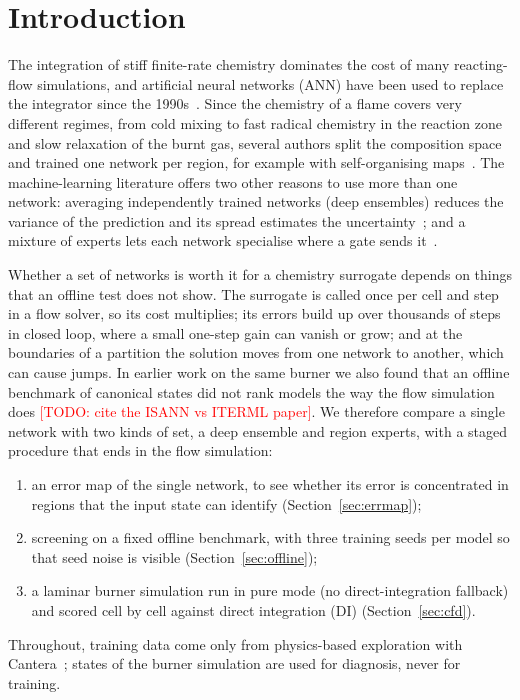 \documentclass[preprint,review,12pt]{elsarticle}
\newcommand{\todo}[1]{\textcolor{red}{[TODO: #1]}}
\begin{document}
\section{Introduction}
\label{sec:intro}

The integration of stiff finite-rate chemistry dominates the cost of many reacting-flow simulations, and
artificial neural networks (ANN) have been used to replace the integrator since the
1990s~\cite{christo1996ann,blasco1998ann}. Since the chemistry of a flame covers very different regimes,
from cold mixing to fast radical chemistry in the reaction zone and slow relaxation of the burnt gas,
several authors split the composition space and trained one network per region, for example with
self-organising maps~\cite{chatzopoulos2013rcce,franke2017rcce,ding2021hybrid,readshaw2021hybrid}. The
machine-learning literature offers two other reasons to use more than one network: averaging
independently trained networks (deep ensembles) reduces the variance of the prediction and its spread
estimates the uncertainty~\cite{dietterich2000ensembles,lakshminarayanan2017ensembles}; and a mixture of
experts lets each network specialise where a gate sends it~\cite{jacobs1991moe}.

Whether a set of networks is worth it for a chemistry surrogate depends on things that an offline test
does not show. The surrogate is called once per cell and step in a flow solver, so its cost multiplies;
its errors build up over thousands of steps in closed loop, where a small one-step gain can vanish or
grow; and at the boundaries of a partition the solution moves from one network to another, which can
cause jumps. In earlier work on the same burner we also found that an offline benchmark of canonical
states did not rank models the way the flow simulation does \todo{cite the ISANN vs ITERML paper}. We
therefore compare a single network with two kinds of set, a deep ensemble and region experts, with a
staged procedure that ends in the flow simulation:
\begin{enumerate}
\item an error map of the single network, to see whether its error is concentrated in regions that the
  input state can identify (Section~\ref{sec:errmap});
\item screening on a fixed offline benchmark, with three training seeds per model so that seed noise is
  visible (Section~\ref{sec:offline});
\item a laminar burner simulation run in pure mode (no direct-integration fallback) and scored cell by cell
  against direct integration (DI) (Section~\ref{sec:cfd}).
\end{enumerate}
Throughout, training data come only from physics-based exploration with Cantera~\cite{cantera}; states of
the burner simulation are used for diagnosis, never for training.
\end{document}
